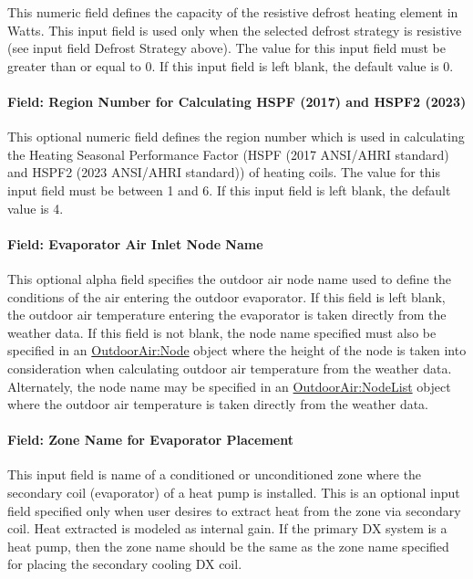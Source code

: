 This numeric field defines the capacity of the resistive defrost heating element in Watts. This input field is used only when the selected defrost strategy is resistive (see input field Defrost Strategy above). The value for this input field must be greater than or equal to 0. If this input field is left blank, the default value is 0.

\paragraph{Field: Region Number for Calculating HSPF (2017) and HSPF2 (2023)}\label{field-region-number-for-calculating-HSPF-2017-and-hspf2-2023}

This optional numeric field defines the region number which is used in calculating the Heating Seasonal Performance Factor (HSPF (2017 ANSI/AHRI standard) and HSPF2 (2023 ANSI/AHRI standard)) of heating coils. The value for this input field must be between 1 and 6. If this input field is left blank, the default value is 4.

\paragraph{Field: Evaporator Air Inlet Node Name}\label{field-evaporator-air-inlet-node-name}

This optional alpha field specifies the outdoor air node name used to define the conditions of the air entering the outdoor evaporator. If this field is left blank, the outdoor air temperature entering the evaporator is taken directly from the weather data. If this field is not blank, the node name specified must also be specified in an \hyperref[outdoorairnode]{OutdoorAir:Node} object where the height of the node is taken into consideration when calculating outdoor air temperature from the weather data. Alternately, the node name may be specified in an \hyperref[outdoorairnodelist]{OutdoorAir:NodeList} object where the outdoor air temperature is taken directly from the weather data.

\paragraph{Field: Zone Name for Evaporator Placement}\label{field-zone-name-for-evaporator-placement}

This input field is name of a conditioned or unconditioned zone where the secondary coil (evaporator) of a heat pump is installed. This is an optional input field specified only when user desires to extract heat from the zone via secondary coil. Heat extracted is modeled as internal gain. If the primary DX system is a heat pump, then the zone name should be the same as the zone name specified for placing the secondary cooling DX coil.

